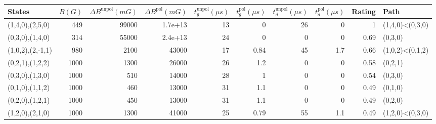 \begin{tabular}{lrrrrrrrrl}
\hline
 {States}         &   {$B(G)$} &   {$\Delta B^{\text{unpol}}(mG)$} &   {$\Delta B^{\text{pol}}(mG)$} &   {$t^{\text{unpol}}_{g}(\mu s)$} &   {$t^{\text{pol}}_{g}(\mu s)$} &   {$t^{\text{unpol}}_{d}(\mu s)$} &   {$t^{\text{pol}}_{d}(\mu s)$} &   {Rating} & {Path}          \\
\hline
 (1,4,0),(2,5,0)  &        449 &                             99000 &                         1.7e+13 &                                13 &                            0    &                                26 &                             0   &       1    & (1,4,0)<(0,3,0) \\
 (0,3,0),(1,4,0)  &        314 &                             55000 &                         2.4e+13 &                                24 &                            0    &                                 0 &                             0   &       0.69 & (0,3,0)         \\
 (1,0,2),(2,-1,1) &        980 &                              2100 &                     43000       &                                17 &                            0.84 &                                45 &                             1.7 &       0.66 & (1,0,2)<(0,1,2) \\
 (0,2,1),(1,2,2)  &       1000 &                              1300 &                     26000       &                                26 &                            1.2  &                                 0 &                             0   &       0.58 & (0,2,1)         \\
 (0,3,0),(1,3,0)  &       1000 &                               510 &                     14000       &                                28 &                            1    &                                 0 &                             0   &       0.54 & (0,3,0)         \\
 (0,1,0),(1,1,2)  &       1000 &                               460 &                     13000       &                                31 &                            1.1  &                                 0 &                             0   &       0.49 & (0,1,0)         \\
 (0,2,0),(1,2,1)  &       1000 &                               450 &                     13000       &                                31 &                            1.1  &                                 0 &                             0   &       0.49 & (0,2,0)         \\
 (1,2,0),(2,1,0)  &       1000 &                              1300 &                     41000       &                                25 &                            0.79 &                                55 &                             1.1 &       0.49 & (1,2,0)<(0,3,0) \\
\hline
\end{tabular}